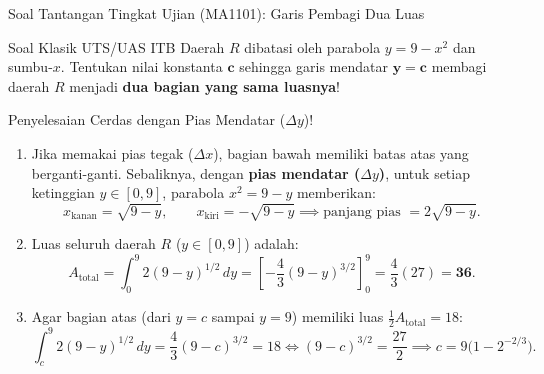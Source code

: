 \documentclass[aspectratio=43,10pt]{beamer}
\begin{document}
\begin{frame}{Soal Tantangan Tingkat Ujian (MA1101): Garis Pembagi Dua Luas}
    \begin{exampleblock}{Soal Klasik UTS/UAS ITB}
        \scriptsize
        Daerah $R$ dibatasi oleh parabola $y = 9 - x^2$ dan sumbu-$x$. Tentukan nilai konstanta $\mathbf{c}$ sehingga garis mendatar $\mathbf{y = c}$ membagi daerah $R$ menjadi \textbf{dua bagian yang sama luasnya}!
    \end{exampleblock}

    \begin{block}{Penyelesaian Cerdas dengan Pias Mendatar ($\Delta y$)!}
        \scriptsize\abovedisplayskip=2pt\belowdisplayskip=2pt
        \begin{enumerate}\itemsep=2pt
            \item Jika memakai pias tegak ($\Delta x$), bagian bawah memiliki batas atas yang berganti-ganti. Sebaliknya, dengan \textbf{pias mendatar ($\Delta y$)}, untuk setiap ketinggian $y \in [0, 9]$, parabola $x^2 = 9 - y$ memberikan:
            $$x_{\text{kanan}} = \sqrt{9 - y}, \qquad x_{\text{kiri}} = -\sqrt{9 - y} \implies \text{panjang pias } = 2\sqrt{9 - y}.$$
            \item Luas seluruh daerah $R$ ($y \in [0, 9]$) adalah:
            $$A_{\text{total}} = \int_{0}^{9} 2(9 - y)^{1/2}\,dy = \left[-\frac{4}{3}(9 - y)^{3/2}\right]_{0}^{9} = \frac{4}{3}(27) = \mathbf{36}.$$
            \item Agar bagian atas (dari $y = c$ sampai $y = 9$) memiliki luas $\frac{1}{2}A_{\text{total}} = 18$:
            $$\int_{c}^{9} 2(9 - y)^{1/2}\,dy = \frac{4}{3}(9 - c)^{3/2} = 18 \iff (9 - c)^{3/2} = \frac{27}{2} \implies \boxed{c = 9\big(1 - 2^{-2/3}\big)}.$$
        \end{enumerate}
    \end{block}
\end{frame}
\end{document}
